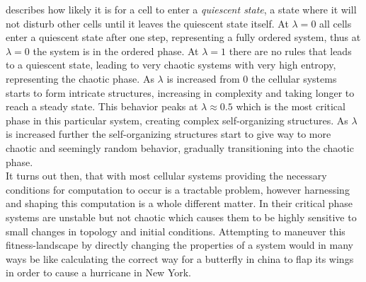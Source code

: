 describes how likely it is for a cell to enter a \textit{quiescent state}, a state
where it will not disturb other cells until it leaves the quiescent state itself.
At $\lambda = 0$ all cells enter a quiescent state after one step, representing
a fully ordered system, thus at $\lambda = 0$ the system is in the ordered phase.
At $\lambda = 1$ there are no rules that leads to a quiescent state, leading to
very chaotic systems with very high entropy, representing the chaotic phase.
As $\lambda$ is increased from 0 the cellular systems starts to form intricate
structures, increasing in complexity and taking longer to reach a steady state.
This behavior peaks at $\lambda \approx 0.5$ which is the most critical phase in this
particular system, creating complex self-organizing structures.
As $\lambda$ is increased further the self-organizing structures start to give
way to more chaotic and seemingly random behavior, gradually transitioning into
the chaotic phase.\\
It turns out then, that with most cellular systems providing the necessary
conditions for computation to occur is a tractable problem, however harnessing
and shaping this computation is a whole different matter.
In their critical phase systems are unstable but not chaotic which causes them to
be highly sensitive to small changes in topology and initial conditions.
Attempting to maneuver this fitness-landscape by directly changing the
properties of a system would in many ways be like calculating the correct way
for a butterfly in china to flap its wings in order to cause a hurricane in New York.\\
